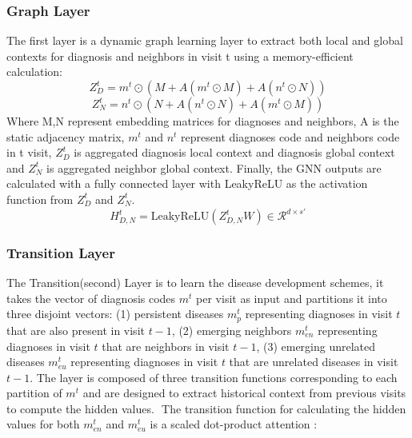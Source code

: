 \documentclass[11pt,a4paper]{article}
\begin{document}
\subsubsection{Graph Layer}
The first layer is a dynamic graph learning layer to extract both local and global contexts for diagnosis and neighbors in visit t using a memory-efficient calculation:
\begin{equation}
  Z_D^t =m^t \odot (M + A(m^t\odot M) + A(n^t\odot N))
\end{equation}
\begin{equation}
  Z_N^t =n^t \odot (N + A(n^t\odot N) + A(m^t\odot M))
\end{equation}
Where M,N represent embedding matrices for diagnoses and neighbors, A is the static adjacency matrix, 
$m^t$ and $n^t$ represent diagnoses code and neighbors code in t visit, $Z_D^t$ is aggregated diagnosis local context and diagnosis global context and $Z_N^t$ is aggregated neighbor global context. Finally, the GNN outputs are calculated with a fully connected layer with LeakyReLU as the activation function from $Z_D^t$ and $Z_N^t$.
\begin{equation}
  H^t_{D,N}=\textrm{LeakyReLU}(Z^t_{D,N}W)\in\mathcal{R}^{d\times s'}
\end{equation}

\subsubsection{Transition Layer}
The Transition(second) Layer is to learn the disease development schemes, it takes the vector of diagnosis codes $m^t$ per visit as
input and partitions it into three disjoint vectors: (1) persistent diseases 
$m_p^t$ representing diagnoses in visit $t$ that are also present in visit $t-1$, 
(2) emerging neighbors $m_{en}^t$ representing diagnoses in visit $t$
that are neighbors in visit $t-1$, (3) emerging unrelated diseases 
$m_{eu}^t$ representing diagnoses in visit $t$ that are unrelated diseases in
visit $t-1$. The layer is composed of three transition functions
corresponding to each partition of $m^t$ and are designed to extract
historical context from previous visits to compute the hidden values. 
​
The transition function for calculating the hidden values for both $m_{en}^t$
and $m_{eu}^t$ is a scaled dot-product attention \cite{dp_attention}: 
\end{document}

